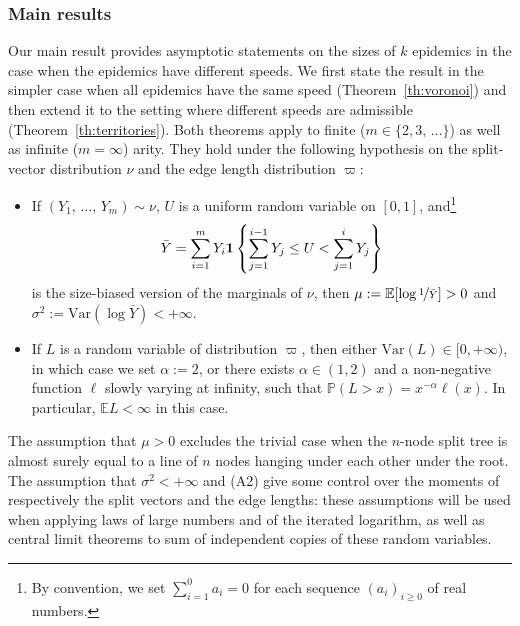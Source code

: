 \documentclass[AHL,Unicode,longabstracts,published]{cedram}
\newcommand{\bs}{\ensuremath{\boldsymbol}}
\newcommand{\bbP}{\mathbb{P}}
\newcommand{\bbE}{\mathbb{E}}
\newcommand{\Var}{\mathrm{Var}}
\begin{document}
\subsubsection{Main results}
Our main result provides asymptotic statements on the sizes of $k$ epidemics in the case when the epidemics have different speeds. We first state the result in the simpler case when all epidemics have the same speed (Theorem~\ref{th:voronoi}) and then extend it to the setting where different speeds are admissible (Theorem~\ref{th:territories}). Both theorems apply to finite ($m\in\{2, 3, \,\ldots\}$) as well as infinite ($m=\infty$) arity. They hold under the following hypothesis on the split-vector distribution $\nu$ and the edge length distribution $\varpi$:
\begin{itemize}
\item[(A1)] If $(Y_1, \,\ldots,\, Y_m)\sim \nu$, $U$ is a uniform random variable on $[0,1]$, and\footnote{By convention, we set $\sum_{i=1}^0 a_i = 0$ for each sequence $(a_i)_{i\geq 0}$ of real numbers.}
\begin{equation}\label{eq:barY}
\bar Y = \sum_{i=1}^m Y_i\bs 1\left\{\sum_{j=1}^{i-1} Y_j\leq U<\sum_{j=1}^{i}Y_j\right\}
\end{equation}
is the size-biased version of the marginals of $\nu$, then $\mu:=\bbE[\log \nicefrac{1}{\bar Y}]> 0$ and $\sigma^2:=\Var(\log \bar Y)<+\infty.$
\item[(A2)] If $L$ is a random variable of distribution $\varpi$, then either $\Var(L) \in [0,+\infty)$, in which case we set $\alpha:=2$, or there exists $\alpha\in (1,2)$ and a non-negative function $\ell$ slowly varying at infinity, such that $\bbP(L> x) = x^{-\alpha}\ell(x)$. In particular, $\bbE L < \infty$ in this case.
\end{itemize}

The assumption that $\mu>0$ excludes the trivial case when the $n$-node split tree is almost surely equal to a line of $n$ nodes hanging under each other under the root. The assumption that $\sigma^2<+\infty$ and (A2) give some control over the moments of respectively the split vectors and the edge lengths: these assumptions will be used when applying laws of large numbers and of the iterated logarithm, as well as central limit theorems to sum of independent copies of these random variables.
\end{document}
